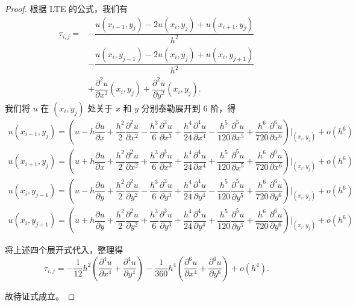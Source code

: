 \documentclass{ctexart}
\begin{document}
\begin{proof}
    根据 LTE 的公式，我们有
    \begin{equation}
        \begin{split}
            \tau_{i,j} = &-\dfrac {u(x_{i-1},y_j) - 2u(x_i,y_j) + u(x_{i+1},y_j)}{h^2}\\ &- \dfrac {u(x_i,y_{j-1}) - 2u(x_i,y_j) + u(x_i,y_{j+1})}{h^2}\\ &+ \dfrac{\partial^2u}{\partial x^2}(x_i,y_j) + \dfrac{\partial^2u}{\partial y^2}(x_i,y_j).
        \end{split}
    \end{equation}
    我们将 $u$ 在 $(x_i,y_j)$ 处关于 $x$ 和 $y$ 分别泰勒展开到 6 阶，得
    \begin{align}
        u(x_{i-1},y_j) = (u - h\dfrac{\partial u}{\partial x} + \dfrac {h^2}2\dfrac{\partial^2u}{\partial x^2}- \dfrac {h^3}6\dfrac{\partial^3u}{\partial x^3}+ \dfrac {h^4}{24}\dfrac{\partial^4u}{\partial x^4}- \dfrac {h^5}{120}\dfrac{\partial^5u}{\partial x^5}+ \dfrac {h^6}{720}\dfrac{\partial^6u}{\partial x^6})|_{(x_i,y_j)}+ o(h^6)\\
        u(x_{i+1},y_j) = (u + h\dfrac{\partial u}{\partial x} + \dfrac {h^2}2\dfrac{\partial^2u}{\partial x^2}+ \dfrac {h^3}6\dfrac{\partial^3u}{\partial x^3}+ \dfrac {h^4}{24}\dfrac{\partial^4u}{\partial x^4}+ \dfrac {h^5}{120}\dfrac{\partial^5u}{\partial x^5}+ \dfrac {h^6}{720}\dfrac{\partial^6u}{\partial x^6})|_{(x_i,y_j)}+ o(h^6)\\
        u(x_i,y_{j-1}) = (u - h\dfrac{\partial u}{\partial y} + \dfrac {h^2}2\dfrac{\partial^2u}{\partial y^2}- \dfrac {h^3}6\dfrac{\partial^3u}{\partial y^3}+ \dfrac {h^4}{24}\dfrac{\partial^4u}{\partial y^4}- \dfrac {h^5}{120}\dfrac{\partial^5u}{\partial y^5}+ \dfrac {h^6}{720}\dfrac{\partial^6u}{\partial y^6})|_{(x_i,y_j)}+ o(h^6)\\
        u(x_i,y_{j+1}) = (u + h\dfrac{\partial u}{\partial y} + \dfrac {h^2}2\dfrac{\partial^2u}{\partial y^2}+ \dfrac {h^3}6\dfrac{\partial^3u}{\partial y^3}+ \dfrac {h^4}{24}\dfrac{\partial^4u}{\partial y^4}+ \dfrac {h^5}{120}\dfrac{\partial^5u}{\partial y^5}+ \dfrac {h^6}{720}\dfrac{\partial^6u}{\partial y^6})|_{(x_i,y_j)}+ o(h^6)
    \end{align}

    将上述四个展开式代入，整理得
    \begin{equation}
        \tau_{i,j} = -\dfrac 1{12}h^2(\dfrac{\partial^4u}{\partial x^4}+\dfrac{\partial^4u}{\partial y^4})-\dfrac 1{360}h^4(\dfrac{\partial^6u}{\partial x^4}+\dfrac{\partial^6u}{\partial y^6})+o(h^4).
    \end{equation}

    故待证式成立。
\end{proof}
\end{document}
